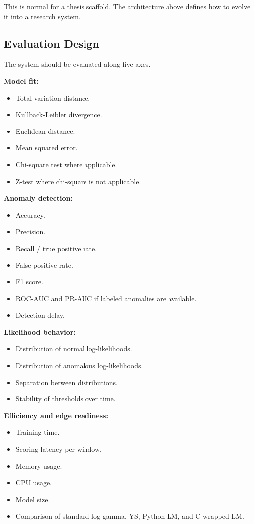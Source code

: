 \documentclass[11pt,a4paper]{article}
\begin{document}
This is normal for a thesis scaffold. The architecture above defines how to evolve it into a research system.

\subsection{Evaluation Design}

The system should be evaluated along five axes.

\textbf{Model fit:}

\begin{itemize}
  \item Total variation distance.
  \item Kullback-Leibler divergence.
  \item Euclidean distance.
  \item Mean squared error.
  \item Chi-square test where applicable.
  \item Z-test where chi-square is not applicable.
\end{itemize}

\textbf{Anomaly detection:}

\begin{itemize}
  \item Accuracy.
  \item Precision.
  \item Recall / true positive rate.
  \item False positive rate.
  \item F1 score.
  \item ROC-AUC and PR-AUC if labeled anomalies are available.
  \item Detection delay.
\end{itemize}

\textbf{Likelihood behavior:}

\begin{itemize}
  \item Distribution of normal log-likelihoods.
  \item Distribution of anomalous log-likelihoods.
  \item Separation between distributions.
  \item Stability of thresholds over time.
\end{itemize}

\textbf{Efficiency and edge readiness:}

\begin{itemize}
  \item Training time.
  \item Scoring latency per window.
  \item Memory usage.
  \item CPU usage.
  \item Model size.
  \item Comparison of standard log-gamma, YS, Python LM, and C-wrapped LM.
\end{itemize}
\end{document}
